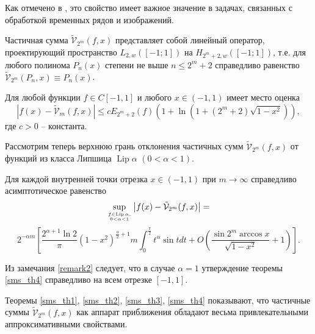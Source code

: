 \noindent Как отмечено в \cite{sms13},
это свойство имеет важное значение в задачах, связанных с обработкой временных рядов и изображений.

\begin{theorem} \label{sms_th2}
  Частичная сумма $\tilde{\mathcal{V}}_{2^m}(f,x)$ представляет собой линейный оператор, проектирующий пространство $L_{2, w}([-1; 1])$ на $H_{2^m+2, w}([-1; 1])$, т.е. для любого полинома $P_n(x)$ степени не выше $n\le 2^{m}+2$ справедливо равенство $\tilde{\mathcal{V}}_{2^m}(P_n,x) \equiv P_n(x)$.
\end{theorem}


\begin{theorem} \label{sms_th3}
  Для любой функции $f\in C[-1,1]$ и любого $x \in (-1, 1)$ имеет место оценка
\begin{equation*}
\label{sms1thrm3eq}
|f(x)-\tilde{\mathcal{V}}_m(f,x)|\le c E_{2^{m}+2}(f)(1+\ln(1+(2^{m}+2)\sqrt{1-x^2})),
\end{equation*}
где $c >0$ -- константа.
\end{theorem}


Рассмотрим теперь верхнюю грань отклонения частичных сумм $\tilde{\mathcal{V}}_{2^m}(f,x)$ от функций из класса Липшица $\operatorname{Lip} \alpha$ $(0< \alpha <1)$.

\begin{theorem} \label{sms_th4}
  Для каждой внутренней точки отрезка $x \in (-1, 1)$ при $m \rightarrow \infty$ справедливо асимптотическое равенство
\begin{equation*}
\sup_{f \in \operatorname{Lip}{\alpha}, \atop 0 < \alpha < 1} \left| f(x) - \tilde{\mathcal{V}}_{2^m}(f,x) \right| =
\end{equation*}
\begin{equation*}
\label{sms1thrm4eq}
2^{-\alpha m} \left[
\frac{2^{\alpha+1}\ln{2}}{\pi} \left( 1-x^2 \right)^{\frac{\alpha}{2}+1}m
\int_{0}^{\frac{\pi}{2}} t^{\alpha} \sin{t} dt +
O \left( \frac{\sin{2^{m} \arccos {x}}}{\sqrt{1-x^2}} + 1\right)
\right].
\end{equation*}
\end{theorem}

\begin{remark} \label{remark2}
Из замечания \ref{remark2} следует, что в случае $\alpha = 1$ утверждение теоремы \ref{sms_th4} справедливо на всем отрезке $[-1, 1]$.
\end{remark}



Теоремы \ref{sms_th1}, \ref{sms_th2}, \ref{sms_th3}, \ref{sms_th4} показывают, что частичные суммы $\tilde{\mathcal{V}}_{2^m}(f,x)$ как аппарат приближения обладают весьма привлекательными аппроксимативными свойствами.


